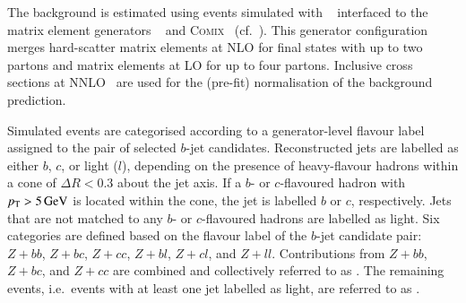 %
%

The \Zjets background is estimated using events simulated with
\SHERPA[2.2.1]~\cite{Bothmann:2019yzt} interfaced to the matrix element
generators \OPENLOOPS~\cite{Buccioni:2019sur,Cascioli:2011va,Denner:2016kdg} and
\textsc{Comix}~\cite{Gleisberg:2008fv} (cf.\ ). This
generator configuration merges hard-scatter matrix elements at NLO for final
states with up to two partons and matrix elements at LO for up to four
partons. Inclusive \Zjets cross sections at NNLO~\cite{Anastasiou:2003ds} are
used for the (pre-fit) normalisation of the background prediction.

Simulated \Zjets events are categorised according to a generator-level flavour
label assigned to the pair of selected $b$-jet candidates. Reconstructed jets
are labelled as either $b$, $c$, or light ($l$), depending on the presence of
heavy-flavour hadrons within a cone of $\Delta R < 0.3$ about the jet axis. If a
$b$- or $c$-flavoured hadron with $p_{\text{T}} > \SI{5}{\ensuremath{\text{GeV}}}$ is located within the
cone, the jet is labelled $b$ or $c$, respectively. Jets that are not matched to
any $b$- or $c$-flavoured hadrons are labelled as light.
Six categories are defined based on the flavour label of the $b$-jet candidate
pair:~$Z + bb$, $Z + bc$, $Z + cc$, $Z + bl$, $Z + cl$, and $Z +
ll$. Contributions from $Z + bb$, $Z + bc$, and $Z + cc$ are combined and
collectively referred to as \ZHF. The remaining \Zjets events, i.e.\ events with
at least one jet labelled as light, are referred to as \ZLF.

